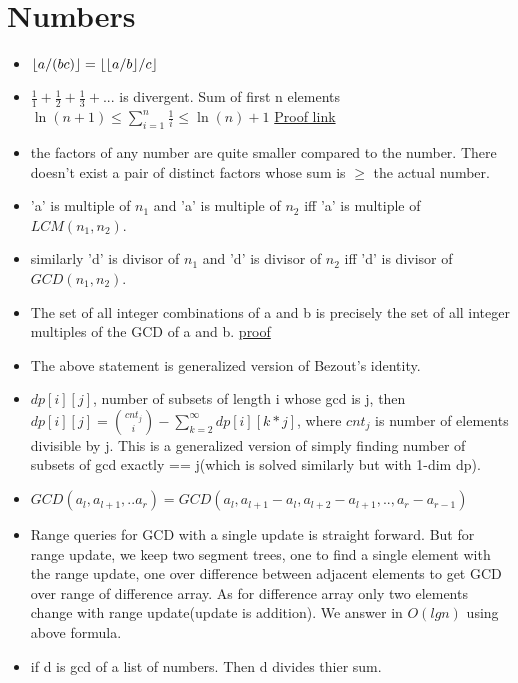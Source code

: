 \documentclass[../Notes.tex]{subfiles}
\begin{document}
\chapter{Numbers}

\begin{itemize}
	\item $\floor*{a/(bc)} = \floor*{\floor*{a/b}/c}$
	\item $\frac{1}{1}+\frac{1}{2}+\frac{1}{3}+...$ is divergent.
	Sum of first n elements \\
	$\ln(n+1)\le\sum_{i=1}^n\frac1i\le\ln(n)+1$
	\href{./Material/divergent series proof.pdf}{Proof link}
	\item the factors of any number are quite smaller compared to the  number. There doesn't exist a pair of distinct factors whose sum is $\geq$ the actual number.
	\item 'a' is multiple of $n_1$ and 'a' is multiple of $n_2$ iff 'a' is multiple of $LCM(n_1,n_2)$. 
	\item similarly 'd' is divisor of $n_1$ and 'd' is divisor of $n_2$ iff 'd' is divisor of $GCD(n_1,n_2)$.
	\item The set of all integer combinations of a and b is precisely the set of all integer multiples of the GCD of a and b. \href{https://proofwiki.org/wiki/Set_of_Integer_Combinations_equals_Set_of_Multiples_of_GCD}{proof}
	\item The above statement is generalized version of Bezout's identity.
	\item $dp[i][j]$, number of subsets of length i whose gcd is j, then\\
	$dp[i][j]={cnt_j\choose i}-\sum_{k=2}^{\infty}dp[i][k*j]$, where $cnt_j$ is number of elements divisible by j. This is a generalized version of simply finding number of subsets of gcd exactly == j(which is solved similarly but with 1-dim dp).
	\item $GCD(a_l,a_{l+1},..a_r) = GCD(a_l,a_{l+1}-a_l,a_{l+2}-a_{l+1},..,a_r-a_{r-1})$
	\item Range queries for GCD with a single update is straight forward. But for range update, we keep two segment trees, one to find a single element with the range update, one over difference between adjacent elements to get GCD over range of difference array. As for difference array only two elements change with range update(update is addition). We answer in $O(lgn)$ using above formula.
	\item if d is gcd of a list of numbers. Then d divides thier sum.
\end{itemize}
\end{document}
